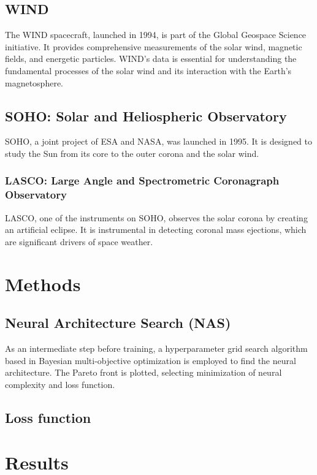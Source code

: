 \documentclass[12pt]{article}
\begin{document}
\subsection{WIND}
The WIND spacecraft, launched in 1994, is part of the Global Geospace Science initiative. It provides comprehensive measurements of the solar wind, magnetic fields, and energetic particles. WIND's data is essential for understanding the fundamental processes of the solar wind and its interaction with the Earth's magnetosphere.

\subsection{SOHO: Solar and Heliospheric Observatory}
SOHO, a joint project of ESA and NASA, was launched in 1995. It is designed to study the Sun from its core to the outer corona and the solar wind.

\subsubsection{LASCO: Large Angle and Spectrometric Coronagraph Observatory}
LASCO, one of the instruments on SOHO, observes the solar corona by creating an artificial eclipse. It is instrumental in detecting coronal mass ejections, which are significant drivers of space weather.

\section{Methods}

\subsection{Neural Architecture Search (NAS)}
As an intermediate step before training, a hyperparameter grid search algorithm based in Bayesian multi-objective optimization is employed to find the neural architecture. The Pareto front is plotted, selecting minimization of neural complexity and loss function.

\subsection{Loss function}


\section{Results}
\end{document}
